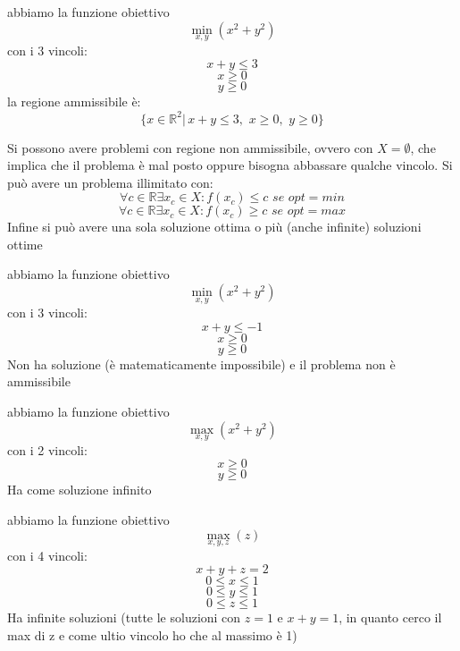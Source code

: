 \documentclass[a4paper,12pt, oneside]{book}
\begin{document}
\begin{esempio}
  abbiamo la funzione obiettivo
  \[\min_{x,y}(x^2+y^2)\]
  con i 3 vincoli:
  \[x+y \leq 3\]
  \[x\geq 0\]
  \[y\geq 0\]
  la regione ammissibile è:
  \[\{x\in\mathbb{R}^2|\,x+y \leq 3,\,\,x\geq 0,\,\,y\geq 0\}\]
\end{esempio}
Si possono avere problemi con regione non ammissibile, ovvero con
$X=\emptyset$, che implica che il problema è mal posto oppure bisogna
abbassare qualche vincolo. Si può avere un problema illimitato con:
\[\forall c \in \mathbb{R}\exists x_c\in X:f(x_c)\leq c\,\, se\,\,
  opt = min\]
\[\forall c \in \mathbb{R}\exists x_c\in X:f(x_c)\geq c\,\, se\,\,
  opt = max\]
Infine si può avere una sola soluzione ottima o più (anche infinite)
soluzioni ottime
\begin{esempio}
  abbiamo la funzione obiettivo
  \[\min_{x,y}(x^2+y^2)\]
  con i 3 vincoli:
  \[x+y \leq -1\]
  \[x\geq 0\]
  \[y\geq 0\]
  Non ha soluzione (è matematicamente impossibile) e il problema
  non è ammissibile
\end{esempio}
\begin{esempio}
  abbiamo la funzione obiettivo
  \[\max_{x,y}(x^2+y^2)\]
  con i 2 vincoli:
  \[x\geq 0\]
  \[y\geq 0\]
  Ha come soluzione infinito
\end{esempio}
\begin{esempio}
  abbiamo la funzione obiettivo
  \[\max_{x,y,z}(z)\]
  con i 4 vincoli:
  \[x+y+z = 2\]
  \[0\leq x \leq 1\]
  \[0\leq y \leq 1\]
  \[0\leq z \leq 1\]
  Ha infinite soluzioni (tutte le soluzioni con $z=1$ e $x+y=1$, in quanto cerco
  il max di z e come ultio vincolo ho che al massimo è 1)
\end{esempio}
\end{document}
